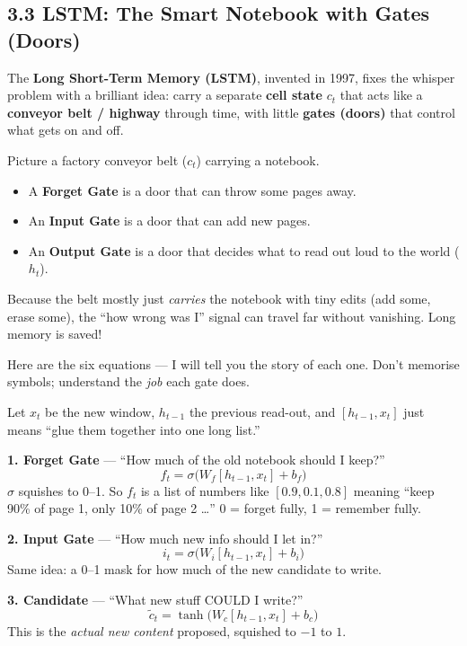 \documentclass[11pt,a4paper]{article}
\begin{document}
\subsection{3.3 LSTM: The Smart Notebook with Gates (Doors)}
\label{sec:lstm}

The \textbf{Long Short-Term Memory (LSTM)}, invented in 1997, fixes the whisper
problem with a brilliant idea: carry a separate \textbf{cell state} $c_t$ that
acts like a \textbf{conveyor belt / highway} through time, with little
\textbf{gates (doors)} that control what gets on and off.

\begin{imaginebox}
Picture a factory conveyor belt ($c_t$) carrying a notebook.

\begin{itemize}[leftmargin=1.6em,itemsep=1pt]
  \item A \textbf{Forget Gate} is a door that can throw some pages away.
  \item An \textbf{Input Gate} is a door that can add new pages.
  \item An \textbf{Output Gate} is a door that decides what to read out loud
        to the world ($h_t$).
\end{itemize}

Because the belt mostly just \emph{carries} the notebook with tiny edits (add
some, erase some), the ``how wrong was I'' signal can travel far without
vanishing. Long memory is saved!
\end{imaginebox}

Here are the six equations --- I will tell you the story of each one. Don't
memorise symbols; understand the \emph{job} each gate does.

Let $x_t$ be the new window, $h_{t-1}$ the previous read-out, and $[h_{t-1}, x_t]$
just means ``glue them together into one long list.''

\textbf{1. Forget Gate} --- ``How much of the old notebook should I keep?''
\[
f_t = \sigma\big( W_f [h_{t-1}, x_t] + b_f \big)
\]
$\sigma$ squishes to 0--1. So $f_t$ is a list of numbers like $[0.9, 0.1, 0.8]$
meaning ``keep 90\% of page 1, only 10\% of page 2 \dots'' 0 = forget fully,
1 = remember fully.

\textbf{2. Input Gate} --- ``How much new info should I let in?''
\[
i_t = \sigma\big( W_i [h_{t-1}, x_t] + b_i \big)
\]
Same idea: a 0--1 mask for how much of the new candidate to write.

\textbf{3. Candidate} --- ``What new stuff COULD I write?''
\[
\tilde{c}_t = \tanh\big( W_c [h_{t-1}, x_t] + b_c \big)
\]
This is the \emph{actual new content} proposed, squished to $-1$ to $1$.
\end{document}
